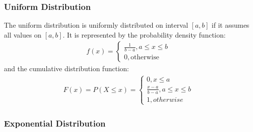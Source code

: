 \documentclass[12pt]{article}
\begin{document}
\subsubsection{Uniform Distribution}
The uniform distribution is uniformly distributed on interval $[a, b]$ if it assumes all values on $[a, b]$. It is represented by the probability density function:
\begin{align*}
	f(x) = \begin{cases}
		\frac{1}{b-a}, a\le x\le b \\
		0, \text{otherwise}
	\end{cases}
\end{align*}
 and the cumulative distribution function:
 \begin{align*}
	 F(x)=P(X\le x)= \begin{cases}
		 0, x\le a \\
		 \frac{x-a}{b-a}, a\le x\le b \\
		 1, otherwise
	 \end{cases}
 \end{align*}
 
 \subsubsection{Exponential Distribution}
 
\end{document}
